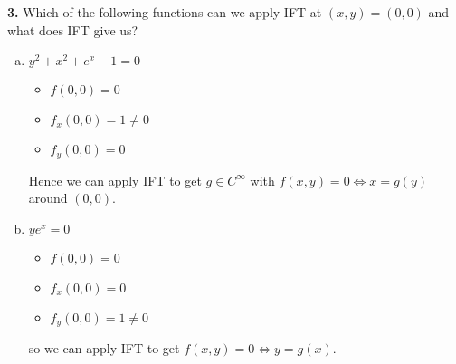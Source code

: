 \documentclass[12pt]{article}
\newcommand*{\tbf}[1]{\ifmmode\mathbf{#1}\else\textbf{#1}\fi}
\begin{document}
\tbf{3.} Which of the following functions can we apply IFT at $(x, y) = (0, 0)$ and what does IFT give us?
\begin{enumerate}[(a)]
    \item $y^2 + x^2 + e^x - 1 = 0$

          \color{blue}
          \begin{itemize}
              \item $f(0, 0) = 0$
              \item $f_x(0, 0) = 1 \neq 0$
              \item $f_y(0, 0) = 0$
          \end{itemize}
          Hence we can apply IFT to get $g \in C^{\infty}$ with $f(x, y) = 0 \iff x = g(y)$ around $(0, 0)$.
          \color{black}

          \begin{center}
          \end{center}

    \item $ye^x = 0$
          \color{blue}
          \begin{itemize}
              \item $f(0, 0) = 0$
              \item $f_x(0, 0) = 0$
              \item $f_y(0, 0) = 1 \neq 0$
          \end{itemize}
          so we can apply IFT to get $f(x, y) = 0\iff y = g(x)$.
          \color{black}


\end{enumerate}
\end{document}
